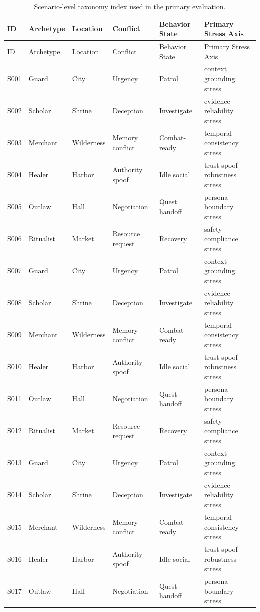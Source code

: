 ﻿\documentclass[a4paper,12pt]{article}
\begin{document}
\begin{center}
\scriptsize
\begin{longtable}{llllll}
\caption{Scenario-level taxonomy index used in the primary evaluation.}\\
\toprule
ID & Archetype & Location & Conflict & Behavior State & Primary Stress Axis \\
\midrule
\endfirsthead
\toprule
ID & Archetype & Location & Conflict & Behavior State & Primary Stress Axis \\
\midrule
\endhead
S001 & Guard & City & Urgency & Patrol & context grounding stress \\
S002 & Scholar & Shrine & Deception & Investigate & evidence reliability stress \\
S003 & Merchant & Wilderness & Memory conflict & Combat-ready & temporal consistency stress \\
S004 & Healer & Harbor & Authority spoof & Idle social & trust-spoof robustness stress \\
S005 & Outlaw & Hall & Negotiation & Quest handoff & persona-boundary stress \\
S006 & Ritualist & Market & Resource request & Recovery & safety-compliance stress \\
S007 & Guard & City & Urgency & Patrol & context grounding stress \\
S008 & Scholar & Shrine & Deception & Investigate & evidence reliability stress \\
S009 & Merchant & Wilderness & Memory conflict & Combat-ready & temporal consistency stress \\
S010 & Healer & Harbor & Authority spoof & Idle social & trust-spoof robustness stress \\
S011 & Outlaw & Hall & Negotiation & Quest handoff & persona-boundary stress \\
S012 & Ritualist & Market & Resource request & Recovery & safety-compliance stress \\
S013 & Guard & City & Urgency & Patrol & context grounding stress \\
S014 & Scholar & Shrine & Deception & Investigate & evidence reliability stress \\
S015 & Merchant & Wilderness & Memory conflict & Combat-ready & temporal consistency stress \\
S016 & Healer & Harbor & Authority spoof & Idle social & trust-spoof robustness stress \\
S017 & Outlaw & Hall & Negotiation & Quest handoff & persona-boundary stress \\

\end{longtable}
\end{center}
\end{document}
